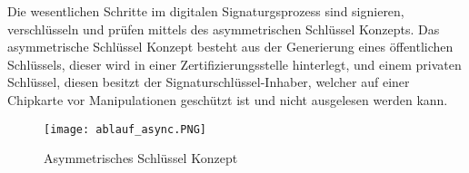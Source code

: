 Die wesentlichen Schritte im digitalen Signaturgsprozess sind signieren, verschlüsseln und prüfen mittels des asymmetrischen Schlüssel Konzepts. Das asymmetrische Schlüssel Konzept besteht aus der Generierung eines öffentlichen Schlüssels, dieser wird in einer Zertifizierungsstelle hinterlegt, und einem privaten Schlüssel, diesen besitzt der Signaturschlüssel-Inhaber, welcher auf einer Chipkarte vor Manipulationen geschützt ist und nicht ausgelesen werden kann. \cite{techno1} 
\begin{figure}[!ht]
    \centering
    \texttt{[image: ablauf\_async.PNG]}
    \caption[Asymmetrisches Schlüssel Konzept]{\small{Asymmetrisches Schlüssel Konzept \cite{techno5}}}
\end{figure}